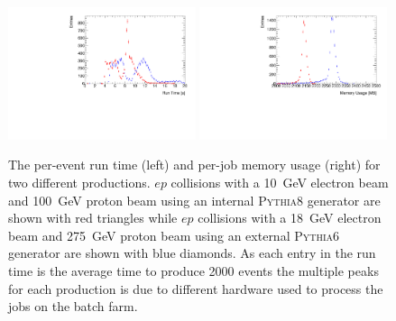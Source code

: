 	
	\begin{figure}[ht]
		\begin{center}
			\includegraphics[width=0.49\textwidth]{figs/simulation_runTime.pdf}
			\includegraphics[width=0.49\textwidth]{figs/simulation_memory.pdf}
		\end{center}
		\caption{\small The per-event run time (left) and per-job memory usage (right) for two different productions. $ep$ collisions with a 10~GeV electron beam and 100~GeV proton beam using an internal \textsc{Pythia8} generator are shown with red triangles while $ep$ collisions with a 18~GeV electron beam and 275~GeV proton beam using an external \textsc{Pythia6} generator are shown with  blue diamonds.  As each entry in the run time is the average time to produce 2000 events the multiple peaks for each production is due to different hardware used to process the jobs on the batch farm.}\label{fig:sim_jobs}
	\end{figure}
	
